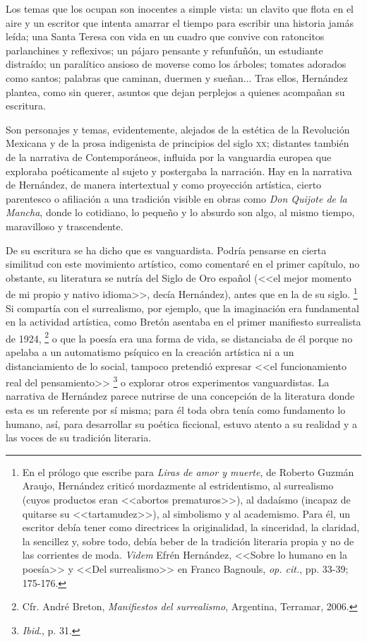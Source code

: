 \documentclass[14pt,twoside,final]{extbook} %
\let\oldfootnote\footnote
\renewcommand\footnote[1]{%
\oldfootnote{\hspace{1mm}#1}}
\begin{document}
Los temas que los ocupan son inocentes a simple vista: un clavito que flota en el aire y un escritor que intenta amarrar el tiempo para escribir una historia jamás leída; una Santa Teresa con vida en un cuadro que convive con ratoncitos parlanchines y reflexivos; un pájaro pensante y refunfuñón, un estudiante distraído; un paralítico ansioso de moverse como los árboles; tomates adorados como santos; palabras que caminan, duermen y sueñan... Tras ellos, Hernández plantea, como sin querer, asuntos que dejan perplejos a quienes acompañan su escritura.

Son personajes y temas, evidentemente, alejados de la estética de la Revolución Mexicana y de la prosa indigenista de principios del siglo \textsc{xx}; distantes también de la narrativa de Contemporáneos, influida por la vanguardia europea que exploraba poéticamente al sujeto y postergaba la narración. Hay en la narrativa de Hernández, de manera intertextual y como proyección artística, cierto parentesco o afiliación a una tradición visible en obras como \emph{Don Quijote de la Mancha}, donde lo cotidiano, lo pequeño y lo absurdo son algo, al mismo tiempo, maravilloso y trascendente.

De su escritura se ha dicho que es vanguardista. Podría pensarse en cierta similitud con este movimiento artístico, como comentaré en el primer capítulo, no obstante, su literatura se nutría del Siglo de Oro español (<<el mejor momento de mi propio y nativo idioma>>, decía Hernández), antes que en la de su siglo.\footnote{En el prólogo que escribe para \emph{Liras de amor y muerte}, de Roberto Guzmán Araujo, Hernández criticó mordazmente al estridentismo, al surrealismo (cuyos productos eran <<abortos prematuros>>), al dadaísmo (incapaz de quitarse su <<tartamudez>>), al simbolismo y al academismo. Para él, un escritor debía tener como directrices la originalidad, la sinceridad, la claridad, la sencillez y, sobre todo, debía beber de la tradición literaria propia y no de las corrientes de moda. \emph{Videm} Efrén Hernández, <<Sobre lo humano en la poesía>> y <<Del surrealismo>> en Franco Bagnouls, \emph{op. cit.}, pp. 33-39; 175-176.} Si compartía con el surrealismo, por ejemplo, que la imaginación era fundamental en la actividad artística, como Bretón asentaba en el primer manifiesto surrealista de 1924,\footnote{Cfr. André Breton, \emph{Manifiestos del surrealismo}, Argentina, Terramar, 2006.} o que la poesía era una forma de vida, se distanciaba de él porque no apelaba a un automatismo psíquico en la creación artística ni a un distanciamiento de lo social, tampoco pretendió expresar <<el funcionamiento real del pensamiento>>\footnote{\emph{Ibid}., p. 31.} o explorar otros experimentos vanguardistas. La narrativa de Hernández parece nutrirse de una concepción de la literatura donde esta es un referente por sí misma; para él toda obra tenía como fundamento lo humano, así, para desarrollar su poética ficcional, estuvo atento a su realidad y a las voces de su tradición literaria.
\end{document}
